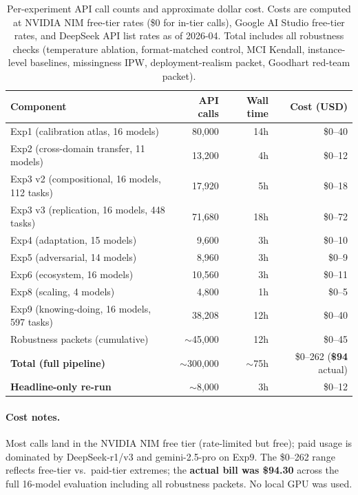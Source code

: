 \documentclass[10pt]{article}
\begin{document}
\begin{table}[h]
\centering
\caption{Per-experiment API call counts and approximate dollar cost. Costs are computed at NVIDIA NIM free-tier rates (\$0 for in-tier calls), Google AI Studio free-tier rates, and DeepSeek API list rates as of 2026-04. Total includes all robustness checks (temperature ablation, format-matched control, MCI Kendall, instance-level baselines, missingness IPW, deployment-realism packet, Goodhart red-team packet).}
\label{tab:compute-cost}
\small
\begin{tabular}{lrrr}
\toprule
Component & API calls & Wall time & Cost (USD) \\
\midrule
Exp1 (calibration atlas, 16 models)         & 80{,}000  & 14h & \$0--40 \\
Exp2 (cross-domain transfer, 11 models)     & 13{,}200  & 4h  & \$0--12 \\
Exp3 v2 (compositional, 16 models, 112 tasks)& 17{,}920 & 5h  & \$0--18 \\
Exp3 v3 (replication, 16 models, 448 tasks) & 71{,}680  & 18h & \$0--72 \\
Exp4 (adaptation, 15 models)                & 9{,}600   & 3h  & \$0--10 \\
Exp5 (adversarial, 14 models)               & 8{,}960   & 3h  & \$0--9 \\
Exp6 (ecosystem, 16 models)                 & 10{,}560  & 3h  & \$0--11 \\
Exp8 (scaling, 4 models)                    & 4{,}800   & 1h  & \$0--5 \\
Exp9 (knowing-doing, 16 models, 597 tasks)  & 38{,}208  & 12h & \$0--40 \\
\midrule
Robustness packets (cumulative)             & $\sim$45{,}000 & 12h & \$0--45 \\
\midrule
\textbf{Total (full pipeline)}              & $\sim$300{,}000 & $\sim$75h & \$0--262 (\textbf{\$94} actual) \\
\textbf{Headline-only re-run}               & $\sim$8{,}000   & 3h  & \$0--12 \\
\bottomrule
\end{tabular}
\end{table}

\paragraph{Cost notes.} Most calls land in the NVIDIA NIM free tier (rate-limited but free); paid usage is dominated by DeepSeek-r1/v3 and gemini-2.5-pro on Exp9. The \$0--262 range reflects free-tier vs.\ paid-tier extremes; the \textbf{actual bill was \$94.30} across the full 16-model evaluation including all robustness packets. No local GPU was used.
\end{document}
